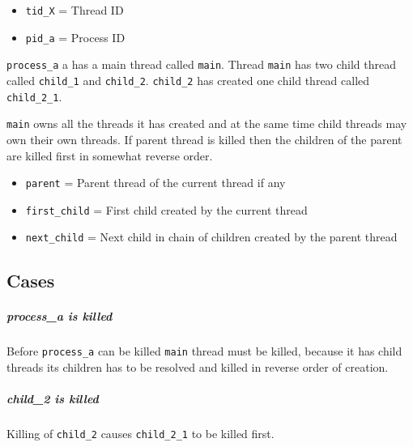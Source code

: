 \begin{itemize}
  \item \verb+tid_X+ = Thread ID
  \item \verb+pid_a+ = Process ID
\end{itemize}

\verb+process_a+ a has a main thread called \verb+main+. Thread
\verb+main+ has two child thread called \verb+child_1+ and \verb+child_2+.
\verb+child_2+ has created one child thread called \verb+child_2_1+.

\verb+main+ owns all the threads it has created and at the same time child
threads may own their own threads. If parent thread is killed then the
children of the parent are killed first in somewhat reverse order.

\begin{itemize}
  \item \verb+parent+ = Parent thread of the current thread if any
  \item \verb+first_child+ = First child created by the current thread
  \item \verb+next_child+ = Next child in chain of children created by the
        parent thread
\end{itemize}

\subsection{Cases}
\subparagraph*{process\_a is killed}

Before \verb+process_a+ can be killed \verb+main+ thread must be killed,
because it has child threads its children has to be resolved and killed in
reverse order of creation.

\subparagraph*{child\_2 is killed}

Killing of \verb+child_2+ causes \verb+child_2_1+ to be killed first.

